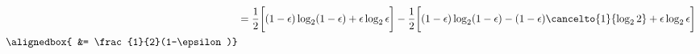 \documentclass[
  coursecode={MTHE 474},
  assignmentname={Homework \homeworknumber},
  studentnumber=20053722,
  name={Bryan Hoang},
  draft,
]{
  ltxanswer%
}
\begin{document}
\begin{questions}
\begin{parts}
\begin{solution}
\begin{align*}
                       &= \frac{1}{2} \biggl[(1-\epsilon)\log_{2}(1-\epsilon) + \epsilon\log_{2}\epsilon\biggr] - \frac{1}{2} \biggl[(1-\epsilon)\log_{2}(1-\epsilon) - (1-\epsilon)\cancelto{1}{\log_{2}2} + \epsilon\log_{2}\epsilon\biggr]                                                                                                                                                                                        \\
          \alignedbox{ &= \frac{1}{2}(1-\epsilon)}
        \end{align*}
      \end{solution}
    \end{parts}
  \end{questions}
\end{document}
